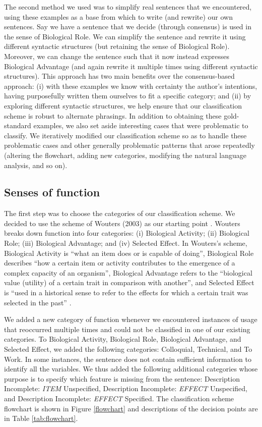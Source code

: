 \documentclass{article}
\begin{document}
The second method we used was to simplify real sentences that we encountered, using these examples as a base from which to write (and rewrite) our own sentences.
Say we have a sentence that we decide (through consensus) is used in the sense of Biological Role.
We can simplify the sentence and rewrite it using different syntactic structures (but retaining the sense of Biological Role).
Moreover, we can change the sentence such that it now instead expresses Biological Advantage (and again rewrite it multiple times using different syntactic structures).
This approach has two main benefits over the consensus-based approach: (i) with these examples we know with certainty the author's intentions, having purposefully written them ourselves to fit a specific category; and (ii) by exploring different syntactic structures, we help ensure that our classification scheme is robust to alternate phrasings.
In addition to obtaining these gold-standard examples, we also set aside interesting cases that were problematic to classify.
We iteratively modified our classification scheme so as to handle these problematic cases and other generally problematic patterns that arose repeatedly (altering the flowchart, adding new categories, modifying the natural language analysis, and so on).

\subsection{Senses of function}
\label{sec:senses-function}

The first step was to choose the categories of our classification scheme.
We decided to use the scheme of Wouters (2003) as our starting point \cite{wouters2003} .
Wouters breaks down function into four categories: (i) Biological Activity; (ii) Biological Role; (iii) Biological Advantage; and (iv) Selected Effect.
In Wouters's scheme, Biological Activity is ``what an item does or is capable of doing'', Biological Role describes ``how a certain item or activity contributes to the emergence of a complex capacity of an organism'', Biological Advantage refers to the ``biological value (utility) of a certain trait in comparison with another'', and Selected Effect is ``used in a historical sense to refer to the effects for which a certain trait was selected in the past'' \cite{wouters2003} .

We added a new category of function whenever we encountered instances of usage that reoccurred multiple times and could not be classified in one of our existing categories.
To Biological Activity, Biological Role, Biological Advantage, and Selected Effect, we added the following categories: Colloquial, Technical, and To Work.
In some instances, the sentence does not contain sufficient information to identify all the variables.
We thus added the following additional categories whose purpose is to specify which feature is missing from the sentence: Description Incomplete: \emph{ITEM} Unspecified, Description Incomplete: \emph{EFFECT} Unspecified, and Description Incomplete: \emph{EFFECT} Specified.
The classification scheme flowchart is shown in Figure \ref{flowchart} and descriptions of the decision points are in Table \ref{tab:flowchart}.
\end{document}
